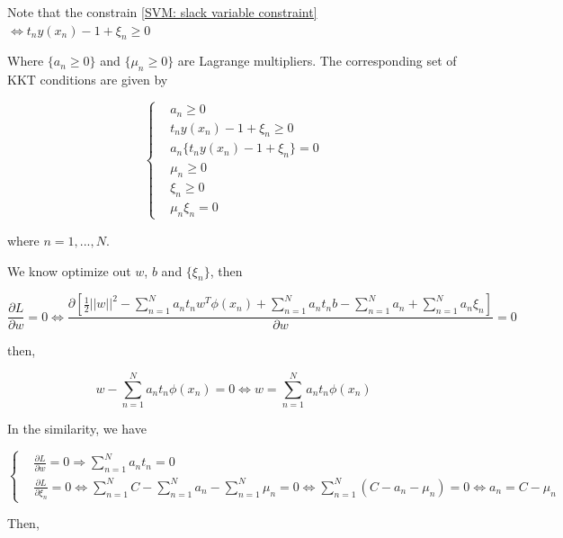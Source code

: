 Note that the constrain \ref{SVM: slack variable constraint} $\Leftrightarrow t_ny(x_n) - 1 + \xi_n \geq 0$
 
Where $\{a_n \geq 0\}$ and $\{\mu_n \geq 0 \}$ are Lagrange multipliers. The corresponding set of KKT conditions are given by


\begin{equation}
    \label{SVM: Lagrangian Soft-margin constraints}
  \left\{
    \begin{aligned}
      & a_n \geq 0\\
      & t_n y(x_n) - 1 + \xi_n \geq 0\\
      & a_n \{t_n y (x_n) - 1 + \xi_n \} = 0\\
      & \mu_n \geq 0\\
      & \xi_n \geq 0\\
      & \mu_n \xi_n = 0
    \end{aligned}
  \right.
\end{equation}

where $n=1,...,N$.

We know optimize out $w$, $b$ and $\{\xi_n\}$, then

\begin{equation}
    \frac{\partial L}{\partial w} = 0 \Leftrightarrow \frac{ \partial [\frac{1}{2} ||w||^2 - \sum_{n=1}^N a_n t_n w^T \phi(x_n) + \sum_{n=1}^N a_n t_n b - \sum_{n=1}^Na_n + \sum_{n=1}^Na_n \xi_n ]}{\partial w}= 0
\end{equation}

then,

\begin{equation}
    w - \sum_{n=1}^N a_n t_n \phi(x_n) = 0 \Leftrightarrow w = \sum_{n=1}^N a_n t_n \phi(x_n)
\end{equation}

In the similarity, we have

\begin{equation}
    \label{SVM: solution of Lagrange soft-margin}
  \left\{
    \begin{aligned}
      & \frac{\partial L}{\partial w} = 0 \Rightarrow \sum_{n=1}^N a_n t_n = 0\\
      & \frac{\partial L}{\partial \xi_n} = 0 \Leftrightarrow \sum_{n=1}^NC - \sum_{n=1}^Na_n - \sum_{n=1}^N \mu_n = 0 \Leftrightarrow  \sum_{n=1}^N(C - a_n - \mu_n) = 0 \Leftrightarrow a_n = C- \mu_n
    \end{aligned}
  \right.
\end{equation}

Then,

